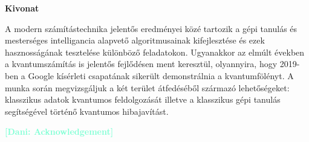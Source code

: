 \documentclass[12pt, a4paper,  nobibnotes]{article}
\newcommand{\nd}[1]{\textcolor{Aquamarine}{\textbf{[Dani: #1]}}}
\begin{document}
\begin{center}
    \textbf{Kivonat}\\
    \par A modern számítástechnika jelentős eredményei közé tartozik a gépi
    tanulás és mesterséges intelligancia alapvető algoritmusainak kifejlesztése és ezek 
    hasznosságának tesztelése különböző feladatokon. Ugyanakkor az elmúlt években a 
    kvantumszámítás is jelentős fejlődésen ment keresztül, olyannyira, hogy 2019-ben a Google kísérleti
    csapatának sikerült demonstrálnia a kvantumfölényt. A munka során megvizsgáljuk a két terület átfedéséből 
    származó lehetőségeket: klasszikus adatok kvantumos feldolgozását illetve a klasszikus
    gépi tanulás segítségével történő kvantumos hibajavítást.
\end{center}
\thispagestyle{empty} %
\newpage

\begin{center}
    \nd{Acknowledgement}
\end{center}

\thispagestyle{empty}
\tableofcontents
\newpage

\thispagestyle{empty}
\listoffigures
\newpage
\end{document}
